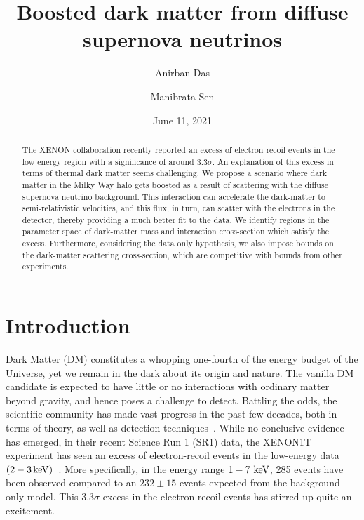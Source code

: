 \documentclass[prd,aps,twocolumn,tightenlines,notitlepage,nofootinbib,preprintnumbers,letterpaper,superscriptaddress]{revtex4-2}
\newcommand{\keV}{{\rm\ keV}}
\begin{document}
\title{Boosted dark matter from diffuse supernova neutrinos}

\author{Anirban Das}
%
%
\author{Manibrata Sen}
\date{June 11, 2021}

\begin{abstract}
The XENON collaboration recently reported an excess of electron recoil events in the low energy region with a significance of around $3.3\sigma$. An explanation of this excess in terms of thermal dark matter seems challenging. We propose a scenario where dark matter in the Milky Way halo gets boosted as a result of scattering with the diffuse supernova neutrino background. This interaction can accelerate the dark-matter to semi-relativistic velocities, and this flux, in turn, can scatter with the electrons in the detector, thereby providing a much better fit to the data. We identify regions in the parameter space of dark-matter mass and interaction cross-section which satisfy the excess. Furthermore, considering the data only hypothesis, we also impose bounds on the dark-matter scattering cross-section, which are competitive with bounds from other experiments. 
\end{abstract}

\maketitle
%
%
%
%
\section{Introduction}
Dark Matter (DM) constitutes a whopping one-fourth of the energy budget of the Universe, yet we remain in the dark about its origin and nature. The vanilla DM candidate is expected to have little or no interactions with ordinary matter beyond gravity, and hence poses a challenge to detect. Battling the odds, the scientific community has made vast progress in the past few decades, both in terms of theory, as well as detection techniques~\cite{Bertone:2004pz}. While no conclusive evidence has emerged, in their recent Science Run 1 (SR1) data, the XENON1T experiment has seen an excess of electron-recoil events in the low-energy data $(2-3\,{\rm keV})$~\cite{Aprile_2020}. More specifically, in the energy range $1-7\keV$, 285 events have been observed compared to an $232\pm 15$ events expected from the background-only model. This $3.3\sigma$ excess in the electron-recoil events has stirred up quite an excitement.
\end{document}
